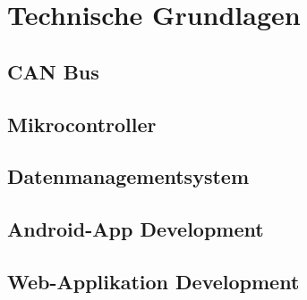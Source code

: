 \section{Technische Grundlagen}
\label{sec:intro}

\subsection{CAN Bus}




\subsection{Mikrocontroller}


\subsection{Datenmanagementsystem}


\subsection{Android-App Development}




\subsection{Web-Applikation Development}

